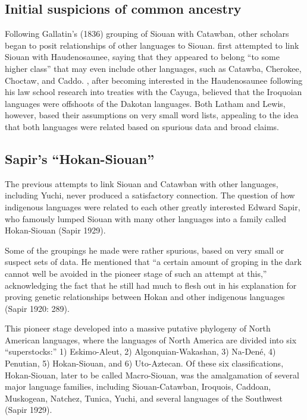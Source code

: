 \documentclass[output=paper]{LSP/langsci}
\begin{document}
\subsection{Initial suspicions of common ancestry}

Following Gallatin's (1836) grouping of Siouan with Catawban, other scholars began to posit relationships of other languages to Siouan. \citet{Latham1856} first attempted to link Siouan with Haudenosaunee, saying that they appeared to belong ``to some higher class'' that may even include other languages, such as Catawba, Cherokee, Choctaw, and Caddo. \citet{Lewis1871}, after becoming interested in the Haudenosaunee following his law school research into treaties with the Cayuga, believed that the Iroquoian languages were offshoots of the Dakotan languages. Both Latham and Lewis, however, based their assumptions on very small word lists, appealing to the idea that both languages were related based on spurious data and broad claims.

\subsection{Sapir's ``Hokan-Siouan''}

The previous attempts to link Siouan and Catawban with other languages, including Yuchi, never produced a satisfactory connection. The question of how indigenous languages were related to each other greatly interested Edward Sapir, who famously lumped Siouan with many other languages into a family called Hokan-Siouan (Sapir 1929). 

Some of the groupings he made were rather spurious, based on very small or suspect sets of data. He mentioned that ``a certain amount of groping in the dark cannot well be avoided in the pioneer stage of such an attempt at this,'' acknowledging the fact that he still had much to flesh out in his explanation for proving genetic relationships between Hokan and other indigenous languages (Sapir 1920: 289). 

This pioneer stage developed into a massive putative phylogeny of North American languages, where the languages of North America are divided into six ``superstocks:'' 1) Eskimo-Aleut, 2) Algonquian-Wakashan, 3) Na-Den\'e, 4) Penutian, 5) Hokan-Siouan, and 6) Uto-Aztecan. Of these six classifications, Hokan-Siouan, later to be called Macro-Siouan, was the amalgamation of several major language families, including Siouan-Catawban, Iroquois, Caddoan, Muskogean, Natchez, Tunica, Yuchi, and several languages of the Southwest (Sapir 1929). 
\end{document}
